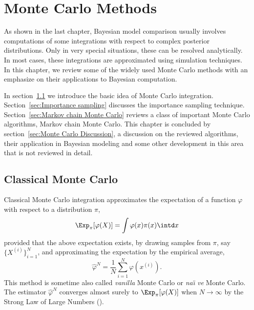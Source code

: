 \chapter{Monte Carlo Methods}
\label{cha:Monte Carlo Methods}


As shown in the last chapter, Bayesian model comparison usually involves
computations of some integrations with respect to complex posterior
distributions. Only in very special situations, these can be resolved
analytically. In most cases, these integrations are approximated using
simulation techniques. In this chapter, we review some of the widely used
Monte Carlo methods with an emphasize on their applications to Bayesian
computation.

In section~\ref{sec:Classical Monte Carlo} we introduce the basic idea of
Monte Carlo integration. Section~\ref{sec:Importance sampling} discusses the
importance sampling technique. Section~\ref{sec:Markov chain Monte Carlo}
reviews a class of important Monte Carlo algorithms, Markov chain Monte Carlo.
This chapter is concluded by section~\ref{sec:Monte Carlo Discussion}, a
discussion on the reviewed algorithms, their application in Bayesian modeling
and some other development in this area that is not reviewed in detail.

\section{Classical Monte Carlo}
\label{sec:Classical Monte Carlo}

Classical Monte Carlo integration approximates the expectation of a function
$\varphi$ with respect to a distribution $\pi$,
\begin{equation}
  \Exp_{\pi}[\varphi(X)] = \int\varphi(x)\pi(x)\intd x
\end{equation}
provided that the above expectation exists, by drawing \iid samples from
$\pi$, say $\{X^{(i)}\}_{i=1}^N$, and approximating the expectation by the
empirical average,
\begin{equation}
  \hat\varphi^N = \frac{1}{N}\sum_{i=1}^N\varphi(x^{(i)}).
  \label{eq:vanilla mc}
\end{equation}
This method is sometime also called \emph{vanilla} Monte Carlo or \emph{na\"\i
  ve} Monte Carlo. The estimator $\hat\varphi^N$ converges almost surely to
$\Exp_{\pi}[\varphi(X)]$ when $N\to\infty$ by the Strong Law of Large Numbers
(\slln).

